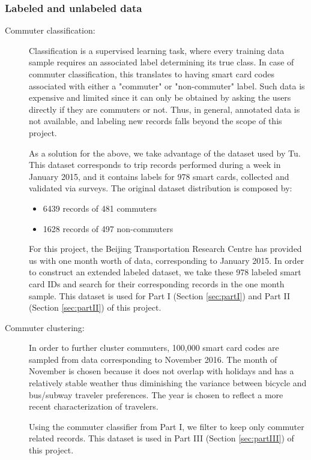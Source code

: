 \documentclass{article}
\begin{document}
\subsubsection{Labeled and unlabeled data}
\begin{description}%
\item[Commuter classification:]
Classification is a supervised learning task, where every training data sample requires an associated label determining its true class. In case of commuter classification, this translates to having smart card codes associated with either a "commuter" or "non-commuter" label. Such data is expensive and limited since it can only be obtained by asking the users directly if they are commuters or not. Thus, in general, annotated data is not available, and labeling new records falls beyond the scope of this project. 

As a solution for the above, we take advantage of the dataset used by Tu\cite{tu2016impact}. This dataset corresponds to trip records performed during a week in January 2015, and it contains labels for 978 smart cards, collected and validated via surveys. The original dataset distribution is composed by:

\begin{itemize}
\item 6439 records of 481 commuters
\item 1628 records of 497 non-commuters
\end{itemize}

For this project, the Beijing Transportation Research Centre has provided us with one month worth of data, corresponding to January 2015. In order to construct an extended labeled dataset, we take these 978 labeled smart card IDs and search for their corresponding records in the one month sample. This dataset is used for Part I (Section \ref{sec:partI}) and Part II (Section \ref{sec:partII}) of this project. 

\item[Commuter clustering:]
In order to further cluster commuters, 100,000 smart card codes are sampled from data corresponding to November 2016. The month of November is chosen because it does not overlap with holidays and has a relatively stable weather thus diminishing the variance between bicycle and bus/subway traveler preferences. The year is chosen to reflect a more recent characterization of travelers. 

Using the commuter classifier from Part I, we filter to keep only commuter related records. This dataset is used in Part III (Section \ref{sec:partIII}) of this project.



\end{description}
\end{document}
